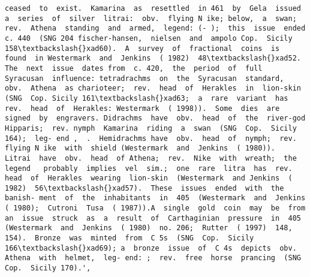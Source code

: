 \documentclass[11pt]{article}
\begin{document}
\begin{Verbatim}[commandchars=\\\{\}]
ceased  to  exist.  Kamarina  as  resettled  in 461  by  Gela  issued  a  series  of  silver  litrai:  obv.  flying N ike; below,  a  swan;  rev.  Athena  standing  and  armed,  legend: (- );  this  issue  ended  c. 440  (SNG 204 fischer-hansen,  nielsen  and  ampolo Cop.  Sicily 158\textbackslash{}xad60).  A  survey  of  fractional  coins  is  found  in Westermark  and  Jenkins  ( 1982)  48\textbackslash{}xad52.  The  next  issue  dates from  c. 420,  the  period  of  full  Syracusan  influence: tetradrachms  on  the  Syracusan  standard,  obv.  Athena  as charioteer;  rev.  head  of  Herakles  in  lion-skin  (SNG  Cop. Sicily 161\textbackslash{}xad63;  a  rare  variant  has  rev.  head  of  Herakles: Westermark  ( 1998)).  Some  dies  are  signed  by  engravers. Didrachms  have  obv.  head  of  the  river-god  Hipparis;  rev. nymph  Kamarina  riding  a  swan  (SNG  Cop.  Sicily 164);  leg- end ,  .  Hemidrachms have  obv.  head  of  nymph;  rev.  flying N ike  with  shield (Westermark  and  Jenkins  ( 1980)).  Litrai  have  obv.  head  of Athena;  rev.  Nike  with  wreath;  the  legend   probably  implies  vel  sim.;  one  rare  litra  has  rev. head  of  Herakles  wearing  lion-skin  (Westermark  and Jenkins  ( 1982)  56\textbackslash{}xad57).  These  issues  ended  with  the  banish- ment  of  the  inhabitants  in  405  (Westermark  and  Jenkins ( 1980);  Cutroni  Tusa  ( 1987)).A  single  gold  coin  may  be  from an  issue  struck  as  a  result  of  Carthaginian  pressure  in  405 (Westermark  and  Jenkins  ( 1980)  no. 206;  Rutter  ( 1997)  148, 154).  Bronze  was  minted  from  C 5s  (SNG  Cop.  Sicily 166\textbackslash{}xad69); a  bronze  issue  of  C 4s  depicts  obv.  Athena  with  helmet,  leg- end: ;  rev.  free  horse  prancing  (SNG Cop.  Sicily 170).',

\end{Verbatim}
\end{document}
